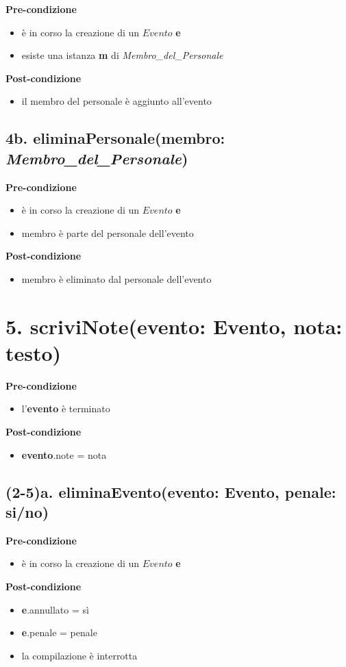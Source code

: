 \documentclass[12pt]{extarticle}
\begin{document}
\textbf{Pre-condizione}
\begin{itemize}
  \item è in corso la creazione di un $Evento$ \textbf{e}
  \item esiste una istanza \textbf{m} di \textit{Membro\_del\_Personale}
\end{itemize}
\textbf{Post-condizione}
\begin{itemize}
  \item il membro del personale è aggiunto all'evento
\end{itemize}


\subsection*{4b. eliminaPersonale(membro: \textit{Membro\_del\_Personale})}

\textbf{Pre-condizione}
\begin{itemize}
  \item è in corso la creazione di un $Evento$ \textbf{e}
  \item membro è parte del personale dell'evento
\end{itemize}
\textbf{Post-condizione}
\begin{itemize}
  \item membro è eliminato dal personale dell'evento
\end{itemize}


\section*{5. scriviNote(evento: Evento, nota: testo)}

\textbf{Pre-condizione}
\begin{itemize}
  \item l'\textbf{evento} è terminato
\end{itemize}
\textbf{Post-condizione}
\begin{itemize}
  \item \textbf{evento}.note = nota
\end{itemize}


\subsection*{(2-5)a. eliminaEvento(evento: Evento, penale: si/no)}

\textbf{Pre-condizione}
\begin{itemize}
  \item è in corso la creazione di un $Evento$ \textbf{e}
\end{itemize}
\textbf{Post-condizione}
\begin{itemize}
  \item \textbf{e}.annullato = sì
  \item \textbf{e}.penale = penale
  \item la compilazione è interrotta
\end{itemize}  
\end{document}
